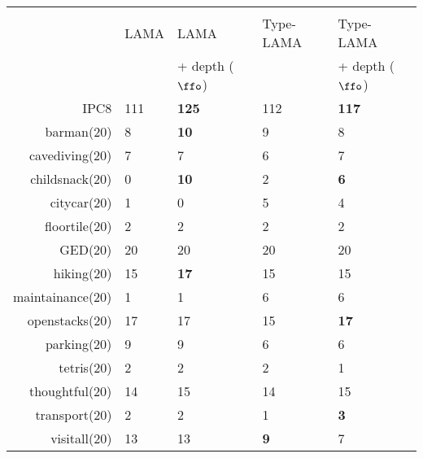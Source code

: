 \begin{center}
\begin{tabular}{|r|ll|ll|}
 &  &  &  & \\
 & LAMA & LAMA & Type-LAMA & Type-LAMA\\
 &  & + depth (\(\ffo\)) &  & + depth (\(\ffo\))\\
\hline
IPC8 & 111 & \textbf{125} & 112 & \textbf{117}\\
\hline
barman(20) & 8 & \textbf{10} & 9 & 8\\
cavediving(20) & 7 & 7 & 6 & 7\\
childsnack(20) & 0 & \textbf{10} & 2 & \textbf{6}\\
citycar(20) & 1 & 0 & 5 & 4\\
floortile(20) & 2 & 2 & 2 & 2\\
GED(20) & 20 & 20 & 20 & 20\\
hiking(20) & 15 & \textbf{17} & 15 & 15\\
maintainance(20) & 1 & 1 & 6 & 6\\
openstacks(20) & 17 & 17 & 15 & \textbf{17}\\
parking(20) & 9 & 9 & 6 & 6\\
tetris(20) & 2 & 2 & 2 & 1\\
thoughtful(20) & 14 & 15 & 14 & 15\\
transport(20) & 2 & 2 & 1 & \textbf{3}\\
visitall(20) & 13 & 13 & \textbf{9} & 7\\
\hline
\end{tabular}
\end{center}
